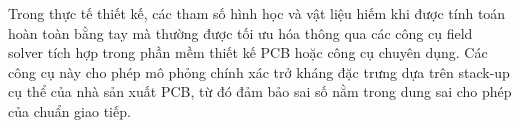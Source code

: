                         Trong thực tế thiết kế, các tham số hình học và vật liệu hiếm khi được tính toán hoàn toàn bằng tay mà thường được tối ưu hóa thông qua các công cụ field solver tích hợp trong phần mềm thiết kế PCB hoặc công cụ chuyên dụng. Các công cụ này cho phép mô phỏng chính xác trở kháng đặc trưng dựa trên stack-up cụ thể của nhà sản xuất PCB, từ đó đảm bảo sai số nằm trong dung sai cho phép của chuẩn giao tiếp.
                        


